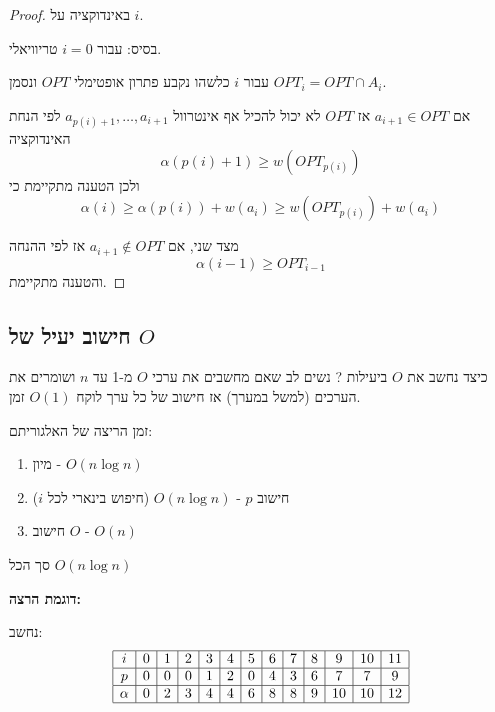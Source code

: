 \begin{proof}
באינדוקציה על $i$.

בסיס: עבור 
$i = 0$
טריוויאלי.

עבור 
$i$
כלשהו נקבע פתרון אופטימלי $OPT$ ונסמן
$OPT_i = OPT \cap A_i$. 

אם
$a_{i+1} \in OPT$
אז $OPT$ לא יכול להכיל אף אינטרוול
$a_{p(i) + 1}, \ldots, a_{i+1}$
לפי הנחת האינדוקציה
$$\alpha(p(i) + 1) \geq w(OPT_{p(i)})$$
ולכן הטענה מתקיימת כי
$$
\alpha(i) \geq
\alpha(p(i)) + w(a_{i}) \geq 
w(OPT_{p(i)}) + w(a_{i})$$

מצד שני, אם 
$a_{i+1} \notin OPT$
אז לפי ההנחה 
$$
\alpha(i - 1) \geq OPT_{i - 1}
$$
והטענה מתקיימת.
\end{proof}

\subsection*{חישוב יעיל של $O$}
כיצד נחשב את $O$ ביעילות ?
נשים לב שאם מחשבים את ערכי $O$ מ-1 עד $n$ ושומרים את הערכים (למשל במערך) אז חישוב של 
כל ערך לוקח 
$O(1)$
זמן.

זמן הריצה של האלגוריתם:
\begin{enumerate}
\item
מיון - 
$O(n\log n)$
\item
חישוב $p$ - 
$O(n\log n)$
(חיפוש בינארי לכל $i$)
\item
חישוב $O$ -
$O(n)$
\end{enumerate}

סך הכל 
$O(n\log n)$

\textbf{דוגמת הרצה:}
\begin{center}
\end{center}

נחשב:
$$
\begin{array}{|c|c|c|c|c|c|c|c|c|c|c|c|c|}
\hline
i & 0 & 1 & 2 & 3 & 4 & 5 & 6 & 7 & 8 & 9 & 10 & 11
\\\hline
p & 0 & 0 & 0 & 1 & 2 & 0 & 4 & 3 & 6 & 7 & 7 & 9
\\\hline
\alpha & 0 & 2 & 3 & 4 & 4 & 6 & 8 & 8 & 9 & 10 & 10 & 12
\\\hline
\end{array}
$$


